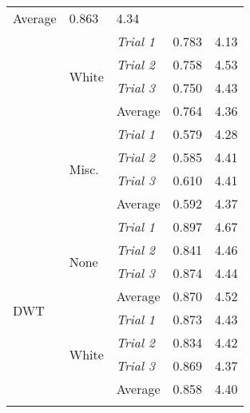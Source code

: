 \begin{longtable}{@{}lllll@{}}
      Average &
      0.863 &
      4.34 \\
    \multicolumn{1}{l|}{} &
      \multicolumn{1}{l|}{\multirow{4}{*}{White}} &
      \textit{Trial 1} &
      0.783 &
      4.13 \\
    \multicolumn{1}{l|}{} &
      \multicolumn{1}{l|}{} &
      \textit{Trial 2} &
      0.758 &
      4.53 \\
    \multicolumn{1}{l|}{} &
      \multicolumn{1}{l|}{} &
      \textit{Trial 3} &
      0.750 &
      4.43 \\
    \multicolumn{1}{l|}{} &
      \multicolumn{1}{l|}{} &
      Average &
      0.764 &
      4.36 \\
    \multicolumn{1}{l|}{} &
      \multicolumn{1}{l|}{\multirow{4}{*}{Misc.}} &
      \textit{Trial 1} &
      0.579 &
      4.28 \\
    \multicolumn{1}{l|}{} &
      \multicolumn{1}{l|}{} &
      \textit{Trial 2} &
      0.585 &
      4.41 \\
    \multicolumn{1}{l|}{} &
      \multicolumn{1}{l|}{} &
      \textit{Trial 3} &
      0.610 &
      4.41 \\
    \multicolumn{1}{l|}{} &
      \multicolumn{1}{l|}{} &
      Average &
      0.592 &
      4.37 \\* \midrule
    \multicolumn{1}{l|}{\multirow{12}{*}{DWT}} &
      \multicolumn{1}{l|}{\multirow{4}{*}{None}} &
      \textit{Trial 1} &
      0.897 &
      4.67 \\
    \multicolumn{1}{l|}{} &
      \multicolumn{1}{l|}{} &
      \textit{Trial 2} &
      0.841 &
      4.46 \\
    \multicolumn{1}{l|}{} &
      \multicolumn{1}{l|}{} &
      \textit{Trial 3} &
      0.874 &
      4.44 \\
    \multicolumn{1}{l|}{} &
      \multicolumn{1}{l|}{} &
      Average &
      0.870 &
      4.52 \\
    \multicolumn{1}{l|}{} &
      \multicolumn{1}{l|}{\multirow{4}{*}{White}} &
      \textit{Trial 1} &
      0.873 &
      4.43 \\
    \multicolumn{1}{l|}{} &
      \multicolumn{1}{l|}{} &
      \textit{Trial 2} &
      0.834 &
      4.42 \\
    \multicolumn{1}{l|}{} &
      \multicolumn{1}{l|}{} &
      \textit{Trial 3} &
      0.869 &
      4.37 \\
    \multicolumn{1}{l|}{} &
      \multicolumn{1}{l|}{} &
      Average &
      0.858 &
      4.40 \\
    \multicolumn{1}{l|}{} &

\end{longtable}
